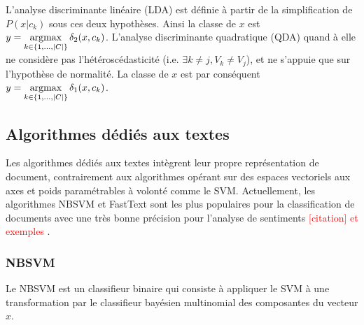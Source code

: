 L'analyse discriminante linéaire (LDA) \citep{fisher1936linearDA} %
est définie à partir de la simplification de $P(x \vert c_k)$ sous ces deux hypothèses. Ainsi la classe de $x$ est $y = \mathop{\mathrm{argmax}}\limits_{k \in \lbrace 1,...,{\vert C\vert} \rbrace} \delta_2(x, c_k)$.
L'analyse discriminante quadratique (QDA) \citep{McLachlan1992DiscrAnalyStatPattRecog-QDA} quand à elle ne considère pas l'hétéroscédasticité (i.e. $\exists k \neq j, V_k \neq V_j$), et ne s'appuie que sur l'hypothèse de normalité. La classe de $x$ est par conséquent $y = \mathop{\mathrm{argmax}}\limits_{k \in \lbrace 1,...,{\vert C\vert} \rbrace} \delta_1(x, c_k)$.



\subsection{Algorithmes dédiés aux textes}
Les algorithmes dédiés aux textes intègrent leur propre représentation de document, contrairement aux algorithmes opérant sur des espaces vectoriels aux axes et poids paramétrables à volonté comme le SVM. Actuellement, les algorithmes NBSVM \citep{wang2012nbsvm} et FastText \citep{grave2017fasttextcls} sont les plus populaires pour la classification de documents avec une très bonne précision pour l'analyse de sentiments \textcolor{red}{[citation] et exemples} \citep{mohammad2018preprocessing4classif-nbsvm-fasttext, joulin2016fasttextzip, shirsath2017twostageNBSVM, elsaadawy2018textClassifAvgW2V}. 


\subsubsection{NBSVM}

Le NBSVM \citep{wang2012nbsvm} est un classifieur binaire qui consiste à appliquer le SVM à une transformation par le classifieur bayésien multinomial des composantes du vecteur $x$.





